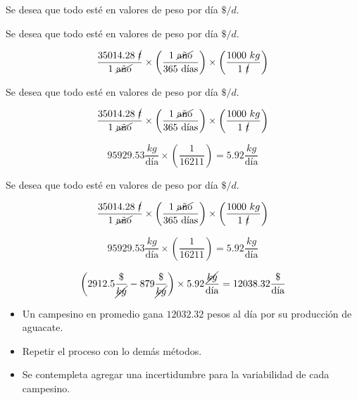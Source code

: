 \documentclass[17pt, t, lualatex]{beamer}
\begin{document}
\begin{frame}[allowframebreaks]

  Se desea que todo esté en valores de peso por día $\$/d$.

\end{frame}


\begin{frame}[allowframebreaks]

  Se desea que todo esté en valores de peso por día $\$/d$.

    \[
    \frac{35014.28\ \cancel{t}}{1\  \cancel{\text{año}}} \times \left( \frac{1 \  \cancel{\text{año}}}{365 \ \text{días}}  \right) \times \left( \frac{1000\ kg}{1 \ \cancel{t}} \right)
    \]

\end{frame}


\begin{frame}[allowframebreaks]

  Se desea que todo esté en valores de peso por día $\$/d$.

    \[
    \frac{35014.28\ \cancel{t}}{1\  \cancel{\text{año}}} \times \left( \frac{1 \  \cancel{\text{año}}}{365 \ \text{días}}  \right) \times \left( \frac{1000\ kg}{1 \ \cancel{t}} \right)
  \]

  \[
    95929.53 \frac{kg}{\text{día}} \times \left( \frac{1}{16211}\right) = 5.92 \frac{kg}{\text{día}} 
  \]

\end{frame}


\begin{frame}[allowframebreaks]

  Se desea que todo esté en valores de peso por día $\$/d$.

    \[
    \frac{35014.28\ \cancel{t}}{1\  \cancel{\text{año}}} \times \left( \frac{1 \  \cancel{\text{año}}}{365 \ \text{días}}  \right) \times \left( \frac{1000\ kg}{1 \ \cancel{t}} \right)
  \]

  \[
    95929.53 \frac{kg}{\text{día}} \times \left( \frac{1}{16211}\right) = 5.92 \frac{kg}{\text{día}} 
  \]

  \[
    \left(2912.5 \frac{\$}{\cancel{kg}} - 879 \frac{\$}{\cancel{kg}} \right) \times 5.92 \frac{\cancel{kg}}{\text{día}} = 12038.32 \frac{\$}{\text{día}}
  \]

\end{frame}


\begin{frame}
  \begin{itemize}
    \item Un campesino en promedio gana $12032.32$ pesos al día por su producción de aguacate.
    \item Repetir el proceso con lo demás métodos.
    \item Se contempleta agregar una incertidumbre para la variabilidad de cada campesino.
  \end{itemize}
\end{frame}
\end{document}
